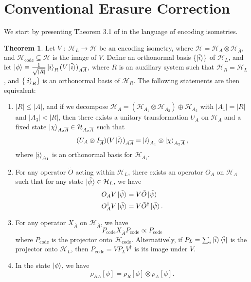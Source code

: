 \documentclass[12pt,a4paper]{report}
\numberwithin{equation}{section}
\newcommand{\ketbra}[2]{\ket{#1}\bra{#2}}
\newcommand{\ketbras}[1]{\ketbra{#1}{#1}}
\newcommand{\Pc}{P_{\text{code}}}
\newcommand{\Hcode}{\mathcal{H}_{\text{code}}}
\newcommand{\ol}[1]{\overline{#1}}
\theoremstyle{definition}
\theoremstyle{theorem}
\newtheorem{theorem}{Theorem}[section]
\theoremstyle{theorem}
\theoremstyle{example}
\theoremstyle{definition}
\begin{document}
\section{Conventional Erasure Correction}
We start by presenting Theorem 3.1 of \cite{Harlow} in the language of encoding isometries.
\begin{theorem}\label{t1}
	Let $V\;:\;\mathcal{H}_{L}\to\mathcal{H}$ be an encoding isometry, where $\mathcal{H}=\mathcal{H}_{A}\otimes\mathcal{H}_{\ol{A}}$, and $\Hcode\subseteq\mathcal{H}$ is the image of $V$. Define an orthonormal basis $\{\ket{\tilde{i}}\}$ of $\mathcal{H}_{L}$, and let $\ket{\phi}\equiv\frac{1}{\sqrt{|R|}}\ket{i}_{R}(V\ket{\tilde{i}})_{A\ol{A}}$, where $R$ is an auxiliary system such that $\mathcal{H}_{R}=\mathcal{H}_{L}$, and $\{\ket{i}_{R}\}$ is an orthonormal basis of $\mathcal{H}_{R}$. The following statements are then equivalent:
	\begin{enumerate}
		\item \label{c1} $|R|\leq|A|$, and if we decompose $\mathcal{H}_{A}=(\mathcal{H}_{A_{1}}\otimes\mathcal{H}_{A_{2}})\oplus\mathcal{H}_{A_{3}}$ with $|A_{1}|=|R|$ and $|A_{3}|<|R|$, then there exists a unitary transformation $U_{A}$ on $\mathcal{H}_{A}$ and a fixed state $\ket{\chi}_{A_{2}\ol{A}}\in\mathcal{H}_{A_{2}\ol{A}}$ such that 
		\begin{equation}\label{C1}
			(U_{A}\otimes I_{\ol{A}})(V\ket{\tilde{i}})_{A\ol{A}}=\ket{i}_{A_{1}}\otimes\ket{\chi}_{A_{2}\ol{A}},
		\end{equation}
		where $\ket{i}_{A_{1}}$ is an orthonormal basis for $\mathcal{H}_{A_{1}}$.
		\item \label{c2} For any operator $\tilde{O}$ acting within $\mathcal{H}_{L}$, there exists an operator $O_{A}$ on $\mathcal{H}_{A}$ such that for any state $\ket{\tilde{\psi}}\in\mathcal{H}_{L}$, we have
		\begin{equation}\label{C2}
			\begin{aligned}
				O_{A}V\ket{\tilde{\psi}}&=V\tilde{O}\ket{\tilde{\psi}}\\
				O_{A}^{\dagger}V\ket{\tilde{\psi}}&=V\tilde{O}^{\dagger}\ket{\tilde{\psi}}.
			\end{aligned}
		\end{equation}
		\item \label{c3} For any operator $X_{\ol{A}}$ on $\mathcal{H}_{\ol{A}}$, we have
		\begin{equation}\label{C3}
			\Pc X_{\ol{A}}\Pc\propto\Pc
		\end{equation}
		where $\Pc$ is the projector onto $\Hcode$. Alternatively, if $P_{L}=\sum_{i}\ketbras{\tilde{i}}$ is the projector onto $\mathcal{H}_{L}$, then $\Pc=VP_{L}V^{\dagger}$ is its image under $V$.
		\item \label{c4} In the state $\ket{\phi}$, we have
		\begin{equation}\label{C4}
			\rho_{R\ol{A}}[\phi]=\rho_{R}[\phi]\otimes\rho_{\ol{A}}[\phi].
		\end{equation}
	\end{enumerate}
\end{theorem}
\end{document}
